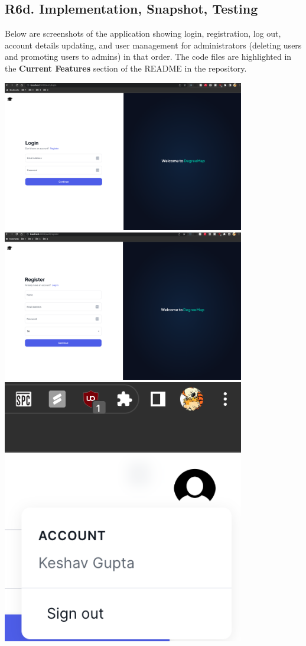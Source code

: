 \documentclass[12pt, a4paper]{article}
\begin{document}
\subsection*{R6d. Implementation, Snapshot, Testing}
Below are screenshots of the application showing login, registration, log out, account details updating, and user management for administrators (deleting users and promoting users to admins) in that order.
The code files are highlighted in the \textbf{Current Features} section of the README in the repository.
\begin{center}
        \includegraphics[width=400px]{R6/i4}
        \includegraphics[width=400px]{R6/i5}
        \includegraphics[width=400px]{R6/i3}

\end{center}
\end{document}
